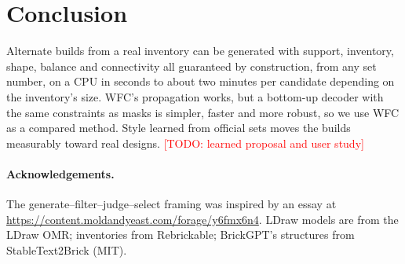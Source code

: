 \documentclass[10pt,twocolumn]{article}
\newcommand{\todo}[1]{\textcolor{red}{[TODO: #1]}}
\begin{document}
\section{Conclusion}
Alternate builds from a real inventory can be generated with support, inventory, shape, balance and connectivity all
guaranteed by construction, from any set number, on a CPU in seconds to about two minutes per candidate
depending on the inventory's size.
WFC's propagation works, but a bottom-up decoder with the same constraints as masks is simpler, faster and more
robust, so we use WFC as a compared method. Style learned from official sets moves the builds measurably toward real
designs. \todo{learned proposal and user study}

\paragraph{Acknowledgements.} The generate--filter--judge--select framing was inspired by an essay at
\url{https://content.moldandyeast.com/forage/y6fmx6n4}. LDraw models are from the LDraw OMR; inventories from
Rebrickable; BrickGPT's structures from StableText2Brick (MIT).

{\small


}
\end{document}
